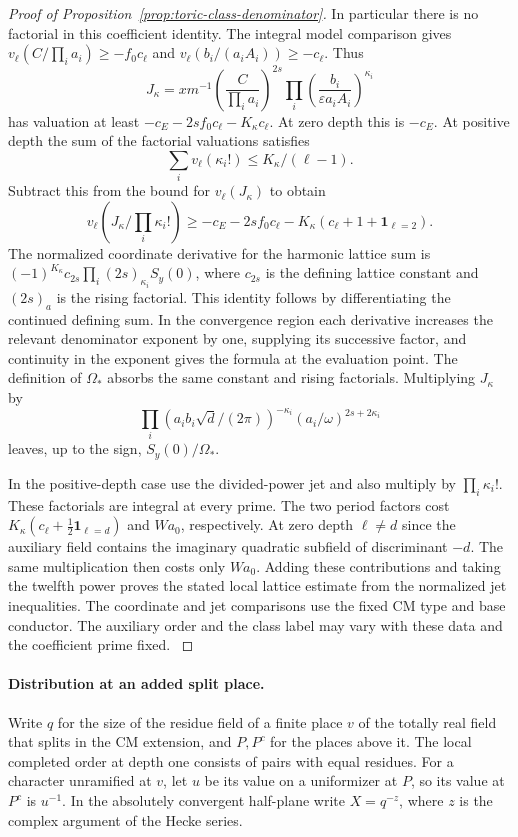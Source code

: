 \begin{proof}[Proof of Proposition~\ref{prop:toric-class-denominator}]
In particular there is no factorial in this coefficient
identity. The integral model comparison gives
\(v_\ell(C/\prod_i a_i)\ge-f_0c_\ell\) and
\(v_\ell(b_i/(a_i A_i))\ge-c_\ell\). Thus
\[
       J_\kappa=x m^{-1}
         \left(\frac{C}{\prod_i a_i}\right)^{2s}
         \prod_i\left(\frac{b_i}{\varepsilon a_i A_i}\right)^{\kappa_i}
\]
has valuation at least \(-c_E-2sf_0c_\ell-K_\kappa c_\ell\).
At zero depth this is \(-c_E\).
At positive depth the sum of the factorial valuations satisfies
\[
                  \sum_i v_\ell(\kappa_i!)\le K_\kappa/(\ell-1).
\]
Subtract this from the bound for \(v_\ell(J_\kappa)\) to obtain
\[
 v_\ell\!\left(J_\kappa/\prod_i\kappa_i!\right)
    \ge -c_E-2sf_0c_\ell
             -K_\kappa(c_\ell+1+\mathbf1_{\ell=2}) .
\]
The normalized coordinate derivative for the harmonic
lattice sum is \((-1)^{K_\kappa}c_{2s}
\prod_i(2s)_{\kappa_i} S_y(0)\), where \(c_{2s}\) is
the defining lattice constant and \((2s)_a\) is the
rising factorial. This identity follows by differentiating
the continued defining sum. In the convergence region each
derivative increases the relevant denominator exponent by
one, supplying its successive factor, and continuity in
the exponent gives the formula at the evaluation point.
The definition of \(\Omega_*\) absorbs the same constant
and rising factorials. Multiplying \(J_\kappa\) by
\[
   \prod_i (a_i b_i\sqrt d/(2\pi))^{-\kappa_i}
                  (a_i/\omega)^{2s+2\kappa_i}
\]
leaves, up to the sign, \(S_y(0)/\Omega_*\).

In the positive-depth case use the divided-power jet
and also multiply by \(\prod_i\kappa_i!\). These
factorials are integral at every prime. The two period
factors cost \(K_\kappa(c_\ell+\tfrac12\mathbf1_{\ell=d})\)
and \(Wa_0\), respectively. At zero depth \(\ell\ne d\)
since the auxiliary field contains the imaginary quadratic
subfield of discriminant \(-d\). The same multiplication
then costs only \(Wa_0\). Adding these contributions
and taking the twelfth power proves the stated local
lattice estimate from the normalized jet inequalities.
The coordinate and jet comparisons use the fixed CM
type and base conductor. The auxiliary order and the
class label may vary with these data and the coefficient
prime fixed. \label{cor:toric-twist-4}
\end{proof}

\paragraph{Distribution at an added split place.}
Write \(q\) for the size of the residue field of a finite place \(v\) of the totally real field
that splits in the CM extension, and \(P,P^c\) for the places above it.
The local completed order at depth one consists of
pairs with equal residues. For a character unramified
at \(v\), let \(u\) be its value on a uniformizer at
\(P\), so its value at \(P^c\) is \(u^{-1}\). In the
absolutely convergent half-plane write \(X=q^{-z}\),
where \(z\) is the complex argument of the Hecke series.


